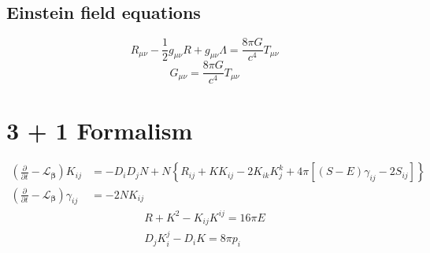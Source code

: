 %
%
\subsection{Einstein field equations}
\[ R_{\mu \nu } - \frac{1}{2} g_{\mu \nu }R + g_{\mu \nu }\Lambda = \frac{8\pi G}{c^4} T_{\mu \nu } \]
\[ G_{\mu \nu } = \frac{8\pi G}{c^4} T_{\mu \nu } \]



%
%
%
%
%
\section{3 + 1 Formalism}



%
%
\begin{align}
  \left( \frac{\partial}{\partial t} - {\mathcal L}_{\boldsymbol \beta} \right) K_{ij}
    & = -D_iD_j N + N \left\{ R_{ij} + KK_{ij} - 2K_{ik} K^k_j + 4\pi \left[ \left( S-E \right) \gamma_{ij} - 2S_{ij} \right] \right\} \\
  \left( \frac{\partial}{\partial t} - {\mathcal L}_{\boldsymbol \beta} \right) \gamma_{ij}
    & = -2NK_{ij}
\end{align}
\begin{gather}
  R + K^2 - K_{ij} K^{ij} = 16\pi E \\
  D_j K^j_i - D_i K = 8\pi p_i
\end{gather}
